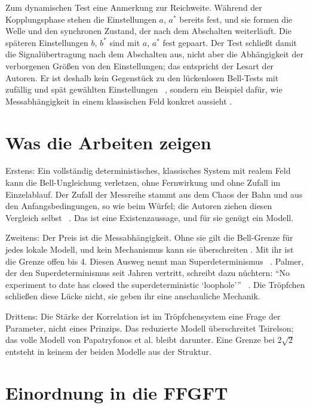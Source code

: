 Zum dynamischen Test eine Anmerkung zur Reichweite. Während der Kopplungsphase stehen die
Einstellungen $a$, $a^*$ bereits fest, und sie formen die Welle und den synchronen Zustand, der nach
dem Abschalten weiterläuft. Die späteren Einstellungen $b$, $b^*$ sind mit $a$, $a^*$ fest gepaart.
Der Test schließt damit die Signalübertragung nach dem Abschalten aus, nicht aber die Abhängigkeit
der verborgenen Größen von den Einstellungen; das entspricht der Lesart der Autoren. Er ist deshalb
kein Gegenstück zu den lückenlosen Bell-Tests mit zufällig und spät gewählten Einstellungen
\EM~\cite{Hensen2015}, sondern ein Beispiel dafür, wie Messabhängigkeit in einem klassischen Feld
konkret aussieht \SM.

\section{Was die Arbeiten zeigen}

Erstens: Ein vollständig deterministisches, klassisches System mit realem Feld kann die
Bell-Ungleichung verletzen, ohne Fernwirkung und ohne Zufall im Einzelablauf. Der Zufall der
Messreihe stammt aus dem Chaos der Bahn und aus den Anfangsbedingungen, so wie beim Würfel; die
Autoren ziehen diesen Vergleich selbst \QM~\cite{Lopez2026}. Das ist eine Existenzaussage, und für sie
genügt ein Modell.

Zweitens: Der Preis ist die Messabhängigkeit. Ohne sie gilt die Bell-Grenze für jedes lokale Modell,
und kein Mechanismus kann sie überschreiten \EM. Mit ihr ist die Grenze offen bis 4. Diesen Ausweg
nennt man Superdeterminismus \QM~\cite{HossenfelderPalmer2020}. Palmer, der
den Superdeterminismus seit Jahren vertritt, schreibt dazu nüchtern: \enquote{No experiment to date
has closed the superdeterministic \enquote{loophole}} \QM~\cite{Palmer2023}. Die Tröpfchen schließen diese
Lücke nicht, sie geben ihr eine anschauliche Mechanik.

Drittens: Die Stärke der Korrelation ist im Tröpfchensystem eine Frage der Parameter, nicht eines
Prinzips. Das reduzierte Modell überschreitet Tsirelson; das volle Modell von Papatryfonos et al.
bleibt darunter. Eine Grenze bei $2\sqrt2$ entsteht in keinem der beiden Modelle aus der Struktur.

\section{Einordnung in die FFGFT}

